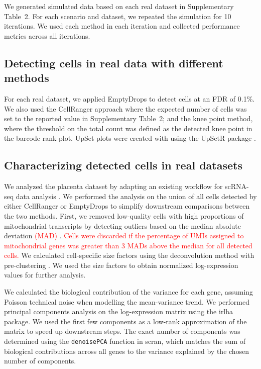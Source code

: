\documentclass{bmcart}
\newcommand{\code}[1]{\texttt{#1}}
\newcommand{\revised}[1]{\textcolor{red}{#1}}
\newcommand{\supptabdataset}{2}
\begin{document}
We generated simulated data based on each real dataset in Supplementary Table~\supptabdataset{}.
For each scenario and dataset, we repeated the simulation for 10 iterations.
We used each method in each iteration and collected performance metrics across all iterations.

\subsection*{Detecting cells in real data with different methods}
For each real dataset, we applied EmptyDrops to detect cells at an FDR of 0.1\%. 
We also used the CellRanger approach where the expected number of cells was set to the reported value in Supplementary Table~\supptabdataset{};
and the knee point method, where the threshold on the total count was defined as the detected knee point in the barcode rank plot.
UpSet plots were created with using the \textsf{UpSetR} package \cite{lex2014upset}.

\subsection*{Characterizing detected cells in real datasets}
We analyzed the placenta dataset by adapting an existing workflow for scRNA-seq data analysis \cite{lun2016stepbystep}.
We performed the analysis on the union of all cells detected by either CellRanger or EmptyDrops to simplify downstream comparisons between the two methods.
First, we removed low-quality cells with high proportions of mitochondrial transcripts by detecting outliers based on the median absolute deviation \revised{(MAD)} \cite{mccarthy2017scater}.
\revised{Cells were discarded if the percentage of UMIs assigned to mitochondrial genes was greater than 3 MADs above the median for all detected cells.}
We calculated cell-specific size factors using the deconvolution method with pre-clustering \cite{lun2016pooling}.
We used the size factors to obtain normalized log-expression values for further analysis.

We calculated the biological contribution of the variance for each gene, assuming Poisson technical noise when modelling the mean-variance trend.
We performed principal components analysis on the log-expression matrix using the \textsf{irlba} package.
We used the first few components as a low-rank approximation of the matrix to speed up downstream steps.
The exact number of components was determined using the \code{denoisePCA} function in \textsf{scran},
which matches the sum of biological contributions across all genes to the variance explained by the chosen number of components.
\end{document}
